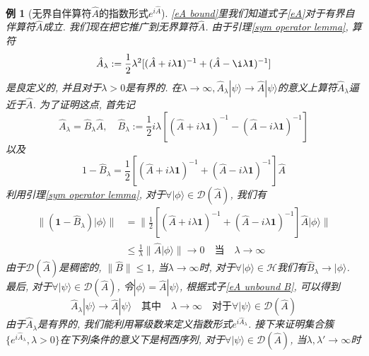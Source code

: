 \documentclass[a4paper,11pt]{book}
\newtheorem{example}{例}[section]
\begin{document}
\begin{example}[无界自伴算符$\hat{A}$的指数形式$e^{i\hat{A}}$]
  \ref{eA bound}里我们知道式子\ref{eA}对于有界自伴算符$\hat{A}$成立. 我们现在把它推广到无界算符$\hat{A}$. 由于引理\ref{sym operator lemma}, 算符
  \begin{equation*}
    \hat{A}_\lambda:=\frac{1}{2}\lambda^2[(\hat{A}+i\lambda\mathbf{1})^{-1}+(\hat{A}-\i\lambda\mathbf{1})^{-1}]
  \end{equation*}
  是良定义的, 并且对于$\lambda>0$是有界的. 在$\lambda\to\infty, \hat{A}_\lambda|\psi\rangle\to\hat{A}|\psi\rangle$的意义上算符$\hat{A}_\lambda$逼近于$\hat{A}$. 为了证明这点, 首先记
  \begin{equation}\label{eA unbound B}
    \hat{A}_\lambda=\hat{B}_\lambda\hat{A},\quad\hat{B}_\lambda:=\frac{1}{2}i\lambda[(\hat{A}+i\lambda\mathbf{1})^{-1}-(\hat{A}-i\lambda\mathbf{1})^{-1}]
  \end{equation}
  以及
  \begin{equation*}
    1-\hat{B}_\lambda=\frac{1}{2}[(\hat{A}+i\lambda\mathbf{1})^{-1}+(\hat{A}-i\lambda\mathbf{1})^{-1}]\hat{A}
  \end{equation*}
  利用引理\ref{sym operator lemma}, 对于$\forall|\phi\rangle\in\mathcal{D}(\hat{A})$, 我们有
  \begin{equation*}
    \begin{split}
       \|(\mathbf{1}-\hat{B}_\lambda)|\phi\rangle\|&=\|\frac{1}{2}[(\hat{A}+i\lambda\mathbf{1})^{-1}+(\hat{A}-i\lambda\mathbf{1})^{-1}]\hat{A}|\phi\rangle\|\\
       &\leq\frac{1}{\lambda}\|\hat{A}|\phi\rangle\|\to0\quad\text{当}\quad\lambda\to\infty
    \end{split}
  \end{equation*}
  由于$\mathcal{D}(\hat{A})$是稠密的, $\|\hat{B}\|\leq1$, 当$\lambda\to\infty$时, 对于$\forall|\phi\rangle\in\mathcal{H}$我们有$\hat{B}_\lambda\to|\phi\rangle$. 最后, 对于$\forall|\psi\rangle\in\mathcal{D}(\hat{A})$, 令$|\phi\rangle=\hat{A}|\psi\rangle$, 根据式子\eqref{eA unbound B}, 可以得到
  \begin{equation}\label{eA unbound limit 1}
    \hat{A}_\lambda|\psi\rangle\to\hat{A}|\psi\rangle\quad\text{其中}\quad\lambda\to\infty\quad\text{对于}\forall|\psi\rangle\in\mathcal{D}(\hat{A})
  \end{equation}
  由于$\hat{A}_\lambda$是有界的, 我们能利用幂级数来定义指数形式$e^{i\hat{A}_\lambda}$. 接下来证明集合簇$\{e^{i\hat{A}_\lambda},\lambda>0\}$在下列条件的意义下是柯西序列, 对于$\forall|\psi\rangle\in\mathcal{D}(\hat{A})$, 当$\lambda,\lambda'\to\infty$时
  \begin{equation*}\label{eA unbound limit 2}

\end{equation*}
\end{example}
\end{document}
